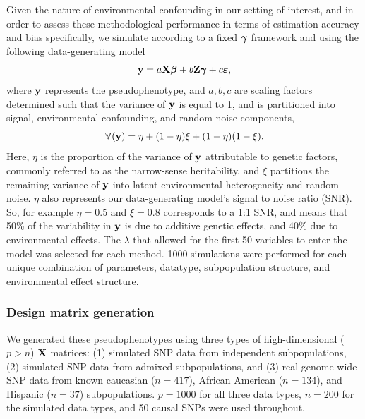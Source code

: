 Given the nature of environmental confounding in our setting of interest, and in order to assess these methodological performance in terms of estimation accuracy and bias specifically, we simulate according to a fixed $\boldsymbol{\gamma}$ framework and using the following data-generating model
\begin{equation}
    \label{eqn:sim}
    \textbf{y} = a \textbf{X} \boldsymbol{\beta} + b \textbf{Z} \boldsymbol{\gamma} + c \boldsymbol{\varepsilon},
\end{equation}
where $\textbf{y}$ represents the pseudophenotype, and $a, b, c$ are scaling factors determined such that the variance of $\textbf{y}$ is equal to 1, and is partitioned into signal, environmental confounding, and random noise components,
\begin{equation}
    \label{eqn:parition_y}
    \mathbb{V}(\textbf{y}) = \eta + (1 - \eta) \xi + (1-\eta)(1-\xi).
\end{equation}
Here, $\eta$ is the proportion of the variance of $\textbf{y}$ attributable to genetic factors, commonly referred to as the narrow-sense heritability, and $\xi$ partitions the remaining variance of $\textbf{y}$ into latent environmental heterogeneity and random noise. $\eta$ also represents our data-generating model's signal to noise ratio (SNR). So, for example $\eta = 0.5$ and $\xi = 0.8$ corresponds to a 1:1 SNR, and means that 50\% of the variability in $\textbf{y}$ is due to additive genetic effects, and 40\% due to environmental effects. The $\lambda$ that allowed for the first 50 variables to enter the model was selected for each method. 1000 simulations were performed for each unique combination of parameters, datatype, subpopulation structure, and environmental effect structure. 

\subsubsection{Design matrix generation}
We generated these pseudophenotypes using three types of high-dimensional ($p > n$) $\textbf{X}$ matrices: (1) simulated SNP data from independent subpopulations, (2) simulated SNP data from admixed subpopulations, and (3) real genome-wide SNP data from known caucasian ($n = 417$), African American ($n = 134$), and Hispanic ($n = 37$) subpopulations.  $p = 1000$ for all three data types, $n = 200$ for the simulated data types, and 50 causal SNPs were used throughout. 


